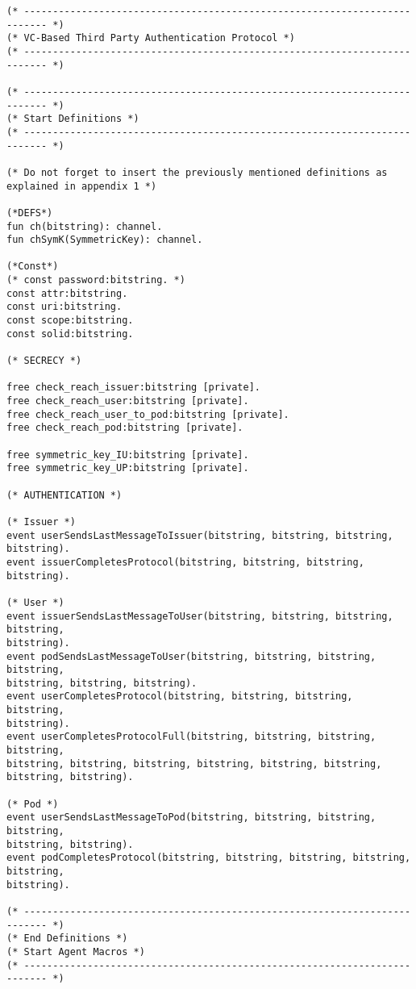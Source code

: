 \begin{Verbatim}[fontsize=\small]
(* -------------------------------------------------------------------------- *)
(* VC-Based Third Party Authentication Protocol *)
(* -------------------------------------------------------------------------- *)

(* -------------------------------------------------------------------------- *)
(* Start Definitions *)
(* -------------------------------------------------------------------------- *)

(* Do not forget to insert the previously mentioned definitions as explained in appendix 1 *)

(*DEFS*)
fun ch(bitstring): channel.
fun chSymK(SymmetricKey): channel.

(*Const*)
(* const password:bitstring. *)
const attr:bitstring.
const uri:bitstring.
const scope:bitstring.
const solid:bitstring.

(* SECRECY *)

free check_reach_issuer:bitstring [private].
free check_reach_user:bitstring [private].
free check_reach_user_to_pod:bitstring [private].
free check_reach_pod:bitstring [private].

free symmetric_key_IU:bitstring [private].
free symmetric_key_UP:bitstring [private].

(* AUTHENTICATION *)

(* Issuer *)
event userSendsLastMessageToIssuer(bitstring, bitstring, bitstring, bitstring).
event issuerCompletesProtocol(bitstring, bitstring, bitstring, bitstring).

(* User *)
event issuerSendsLastMessageToUser(bitstring, bitstring, bitstring, bitstring, 
bitstring).
event podSendsLastMessageToUser(bitstring, bitstring, bitstring, bitstring, 
bitstring, bitstring, bitstring).
event userCompletesProtocol(bitstring, bitstring, bitstring, bitstring, 
bitstring).
event userCompletesProtocolFull(bitstring, bitstring, bitstring, bitstring, 
bitstring, bitstring, bitstring, bitstring, bitstring, bitstring, bitstring, bitstring).

(* Pod *)
event userSendsLastMessageToPod(bitstring, bitstring, bitstring, bitstring, 
bitstring, bitstring).
event podCompletesProtocol(bitstring, bitstring, bitstring, bitstring, bitstring, 
bitstring).

(* -------------------------------------------------------------------------- *)
(* End Definitions *)
(* Start Agent Macros *)
(* -------------------------------------------------------------------------- *)


\end{Verbatim}
